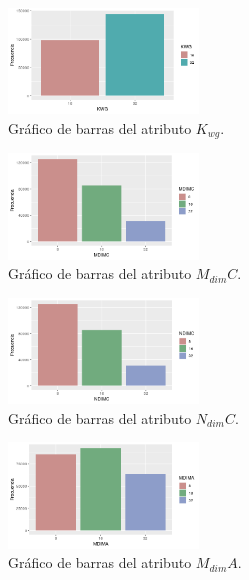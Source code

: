 \documentclass[osajnl,twocolumn,showpacs,superscriptaddress,10pt]{revtex4-1} %
\begin{document}
\begin{figure}[H]
    \centering
    \includegraphics[width=0.45\textwidth]{plots/kwg_bar}
    \caption{Gráfico de barras del atributo $K_{wg}$.}
    \label{figure:kwg_bar}
\end{figure}

\begin{figure}[H]
    \centering
    \includegraphics[width=0.45\textwidth]{plots/mdimc_bar}
    \caption{Gráfico de barras del atributo $M_{dim}C$.}
    \label{figure:MDIMC_bar}
\end{figure}

\begin{figure}[H]
    \centering
    \includegraphics[width=0.45\textwidth]{plots/ndimc_bar}
    \caption{Gráfico de barras del atributo $N_{dim}C$.}
    \label{figure:ndimc_bar}
\end{figure}

\begin{figure}[H]
    \centering
    \includegraphics[width=0.45\textwidth]{plots/mdima_bar}
    \caption{Gráfico de barras del atributo $M_{dim}A$.}
    \label{figure:mdima_bar}
\end{figure}
\end{document}
